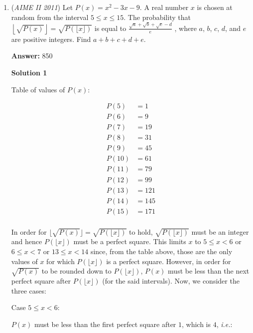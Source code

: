 \begin{enumerate}
 Therefore, the answer is $\boxed{440}$

 \href{https://mathproblemsolvingskills.wordpress.com/}{MathProblemSolvingSkills.com}

 


 


	\item (\textit{AIME II 2011}) Let $P(x) = x^2 - 3x - 9$. A real number $x$ is chosen at random from the interval $5 \le x \le 15$. The probability that $\left\lfloor\sqrt{P(x)}\right\rfloor = \sqrt{P(\lfloor x \rfloor)}$ is equal to $\frac{\sqrt{a} + \sqrt{b} + \sqrt{c} - d}{e}$ , where $a$, $b$, $c$, $d$, and $e$ are positive integers. Find $a + b + c + d + e$.


 
 \textbf{Answer: }850



\textbf{Solution 1}

Table of values of $P(x)$:

 
 \begin{align*} P(5) &= 1 \\ P(6) &= 9 \\ P(7) &= 19 \\ P(8) &= 31 \\ P(9) &= 45 \\ P(10) &= 61 \\ P(11) &= 79 \\ P(12) &= 99 \\ P(13) &= 121 \\ P(14) &= 145 \\ P(15) &= 171 \\ \end{align*}


 In order for $\lfloor \sqrt{P(x)} \rfloor = \sqrt{P(\lfloor x \rfloor)}$ to hold, $\sqrt{P(\lfloor x \rfloor)}$ must be an integer and hence $P(\lfloor x \rfloor)$ must be a perfect square. This limits $x$ to $5 \le x < 6$ or $6 \le x < 7$ or $13 \le x < 14$ since, from the table above, those are the only values of $x$ for which $P(\lfloor x \rfloor)$ is a perfect square. However, in order for $\sqrt{P(x)}$ to be rounded down to $P(\lfloor x \rfloor)$, $P(x)$ must be less than the next perfect square after $P(\lfloor x \rfloor)$ (for the said intervals). Now, we consider the three cases:

 
Case $5 \le x < 6$:

 $P(x)$ must be less than the first perfect square after $1$, which is $4$, \textit{i.e.}:


\end{enumerate}
